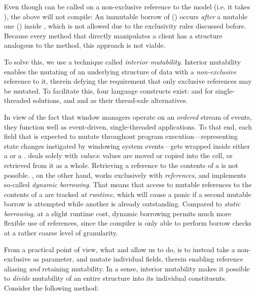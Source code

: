 Even though  can be called on a non-exclusive
reference to the model (i.e. it takes ), the
above will not compile: An immutable borrow of 
() occurs \textit{after}
a mutable one () inside
, which is not allowed due to the exclusivity rules
discussed before. Because every method that directly manipulates a client has a
structure analogous to the  method, this approach is
not viable.

To solve this, we use a technique called \textit{interior mutability}. Interior
mutability enables the mutating of an underlying structure of data with a
\textit{non-exclusive} reference to it, therein defying the requirement that
only exclusive references may be mutated\cite{therustbook}. To facilitate
this, four language constructs exist:  and  for
single-threaded solutions, and  and  as their
thread-safe alternatives\cite{therustbook, therustreference}.

In view of the fact that window managers operate on an \textit{ordered}
stream of events, they function well as event-driven, single-threaded
applications. To that end, each  field that is expected to
mutate throughout program execution---representing state changes instigated
by windowing system events---gets wrapped inside either a  or a
.  deals solely with \textit{values}: values are moved
or copied into the cell, or retrieved from it as a whole\cite{therustbook,
intmutpatterns}. Retrieving a reference to the contents of a  is
not possible\cite{therustbook, intmutpatterns}. , on the other
hand, works exclusively with \textit{references}, and implements so-called
\textit{dynamic borrowing}\cite{therustbook, intmutpatterns}. That means
that access to mutable references to the contents of a  are
tracked \textit{at runtime}, which will cause a panic if a second mutable
borrow is attempted while another is already outstanding\cite{therustbook,
intmutpatterns}. Compared to \textit{static borrowing}, at a slight runtime
cost, dynamic borrowing permits much more flexible use of references, since
the compiler is only able to perform borrow checks at a rather coarse level of
granularity\cite{therustbook, intmutpatterns}.

From a practical point of view, what  and  allow us to
do, is to instead take a non-exclusive  as parameter, and mutate
individual fields, therein enabling reference aliasing \textit{and} retaining
mutability. In a sense, interior mutability makes it possible to \textit{divide}
mutability of an entire structure into its individual constituents. Consider the
following  method:

